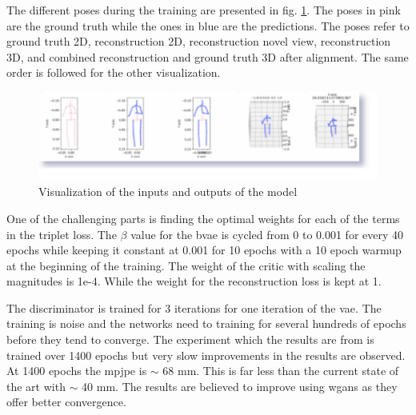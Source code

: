 The different poses during the training are presented in fig. \ref{fig:sample_pred}. The poses in pink are the ground truth while the ones in blue are the predictions. The poses refer to ground truth 2D, reconstruction 2D, reconstruction novel view, reconstruction 3D, and combined reconstruction and ground truth 3D after alignment. The same order is followed for the other visualization. 

\begin{figure}[h]
    \centering
    \includegraphics[scale=0.4]{figures/results/sample_pred.png}
    \caption{Visualization of the inputs and outputs of the model}
    \label{fig:sample_pred}
\end{figure}

One of the challenging parts is finding the optimal weights for each of the terms in the triplet loss. The $\beta$ value for the \ac{bvae} is cycled from 0 to 0.001 for every 40 epochs while keeping it constant at 0.001 for 10 epochs with a 10 epoch warmup at the beginning of the training. The weight of the critic with scaling the magnitudes is 1e-4. While the weight for the reconstruction loss is kept at 1. 

The discriminator is trained for 3 iterations for one iteration of the \ac{vae}. The training is noise and the networks need to training for several hundreds of epochs before they tend to converge. The experiment which the results are from is trained over 1400 epochs but very slow improvements in the results are observed. At 1400 epochs the \ac{mpjpe} is $\sim$ 68 mm. This is far less than the current state of the art \cite{amazon1} with $\sim$ 40 mm. The results are believed to improve using \acp{wgan} as they offer better convergence. 

